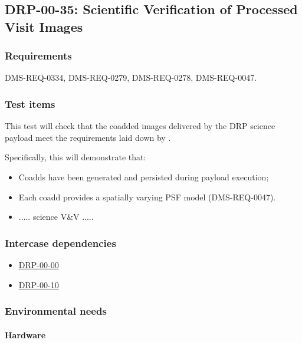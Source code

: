 \subsection{DRP-00-35: Scientific Verification of Processed Visit Images}
\label{drp-00-35}

\subsubsection{Requirements}

DMS-REQ-0334, DMS-REQ-0279, DMS-REQ-0278, DMS-REQ-0047.

\subsubsection{Test items}
\label{drp-00-35-items}

This test will check that the coadded images  delivered by the DRP science
payload meet the requirements laid down by .

Specifically, this will demonstrate that:

\begin{itemize}

  \item{Coadds have been generated and persisted during payload execution;}
  \item{Each coadd provides a spatially varying PSF model (DMS-REQ-0047).}
  \item{..... science V\&V .....}

\end{itemize}

\subsubsection{Intercase dependencies}

\begin{itemize}

  \item{\hyperref[drp-00-00]{DRP-00-00}}
  \item{\hyperref[drp-00-10]{DRP-00-10}}

\end{itemize}

\subsubsection{Environmental needs}

\paragraph{Hardware}

